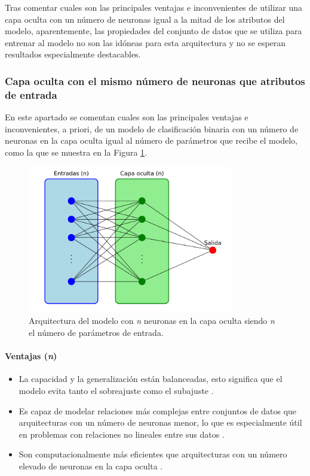 Tras comentar cuales son las principales ventajas e inconvenientes de utilizar una capa oculta con un número de neuronas igual a la mitad de los atributos del modelo, aparentemente, las propiedades del conjunto de datos que se utiliza para entrenar al modelo no son las idóneas para esta arquitectura y no se esperan resultados especialmente destacables.

\subsubsection{Capa oculta con el mismo número de neuronas que atributos de entrada}\label{sec:VIBIN49}
En este apartado se comentan cuales son las principales ventajas e inconvenientes, a priori, de un modelo de clasificación binaria con un número de neuronas en la capa oculta igual al número de parámetros que recibe el modelo, como la que se muestra en la Figura \ref{fig:arqnBIN}.

\begin{figure}[H]
    \centering
    \includegraphics[width=0.8\textwidth]{./img/modelo/arqnBIN.pdf}
    \caption{Arquitectura del modelo con \textit{n} neuronas en la capa oculta siendo \textit{n} el número de parámetros de entrada.}
    \label{fig:arqnBIN}
\end{figure}

\paragraph{Ventajas (\textit{n})}
\begin{itemize}
	\item La capacidad y la generalización están balanceadas, esto significa que el modelo evita tanto el sobreajuste como el subajuste \cite{zhang2016understanding}.
	\item Es capaz de modelar relaciones más complejas entre conjuntos de datos que arquitecturas con un número de neuronas menor, lo que es especialmente útil en problemas con relaciones no lineales entre sus datos \cite{goodfellow2016deep}.
	\item Son computacionalmente más eficientes que arquitecturas con un número elevado de neuronas en la capa oculta \cite{bengio2006greedy}. 
\end{itemize}
